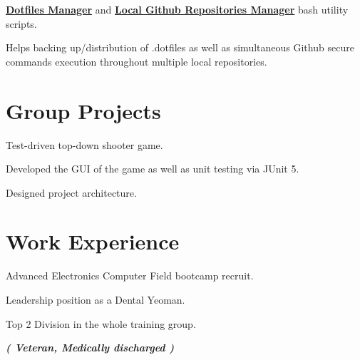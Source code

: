 \documentclass[]{deedy-resume-openfont}
\begin{document}
\begin{minipage}[t]{0.60\textwidth}
\vspace{\topsep} %
\begin{tightemize}
\item \textbf{\href{https://github.com/marklcrns/scripts/tree/master/tools/dotfiles}{Dotfiles Manager}} and \textbf{\href{https://github.com/marklcrns/scripts/tree/master/tools/git}{Local Github Repositories Manager}} bash utility scripts.
\item Helps backing up/distribution of .dotfiles as well as simultaneous Github secure commands execution throughout multiple local repositories.
\end{tightemize}

\section{Group Projects}
\vspace{\topsep} %
\begin{tightemize}
\item Test-driven top-down shooter game.
\item Developed the GUI of the game as well as unit testing via JUnit 5.
\item Designed project architecture.
\end{tightemize}
\sectionsep


\section{Work Experience}

\vspace{\topsep} %
\begin{tightemize}
\item Advanced Electronics Computer Field bootcamp recruit.
\item Leadership position as a Dental Yeoman.
\item Top 2 Division in the whole training group.
\end{tightemize}
{\footnotesize \textit{\textbf{( Veteran, Medically discharged ) }}}
\sectionsep


\end{minipage}
\end{document}
